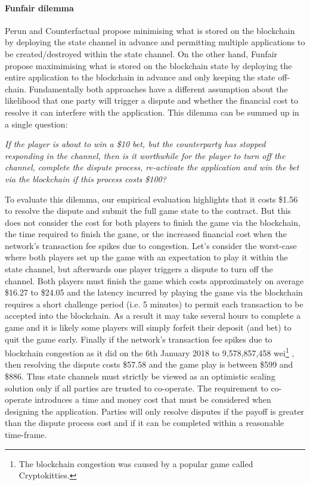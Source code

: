 \documentclass{llncs}
\begin{document}
\paragraph{Funfair dilemma} 
Perun and Counterfactual propose minimising what is stored on the blockchain by deploying the state channel in advance and permitting multiple applications to be created/destroyed within the state channel. 
On the other hand, Funfair propose maximimising what is stored on the blockchain state by deploying the entire application to the blockchain in advance and only keeping the state off-chain. 
Fundamentally both approaches have a different assumption about the likelihood that one party will trigger a dispute and whether the financial cost to resolve it can interfere with the application. 
This dilemma can be summed up in a single question:

\begin{center}
\textit{If the player is about to win a \$10 bet, but the counterparty has stopped responding in the channel, then is it worthwhile for the player to turn off the channel, complete the dispute process, re-activate the application and win the bet via the blockchain if this process costs \$100?} 
\end{center} 

To evaluate this dilemma, our empirical evaluation highlights that it costs \$1.56 to resolve the dispute and submit the full game state to the contract.
But this does not consider the cost for both players to finish the game via the blockchain, the time required to finish the game, or the increased financial cost when the network's transaction fee spikes due to congestion. %
Let's consider the worst-case where both players set up the game with an expectation to play it within the state channel, but afterwards one player triggers a dispute to turn off the channel. 
Both players must finish the game which costs approximately on average \$16.27 to \$24.05 and the latency incurred by playing the game via the blockchain requires a short challenge period (i.e. 5 minutes) to permit each transaction to be accepted into the blockchain. 
As a result it may take several hours to complete a game and it is likely some players will simply forfeit their deposit (and bet) to quit the game early. 
Finally if the network's transaction fee spikes due to blockchain congestion as it did on the 6th January 2018 to 9,578,857,458 wei\footnote{The blockchain congestion was caused by a popular game called Cryptokitties.}  \cite{etherscan}, then resolving the dispute costs \$57.58 and the game play is between \$599 and \$886.  %
Thus state channels must strictly be viewed as an optimistic scaling solution only if all parties are trusted to co-operate.
The requirement to co-operate introduces a time and money cost that must be considered when designing the application.
Parties will only resolve disputes if the payoff is greater than the dispute process cost and if it can be completed within a reasonable time-frame. 
\end{document}
